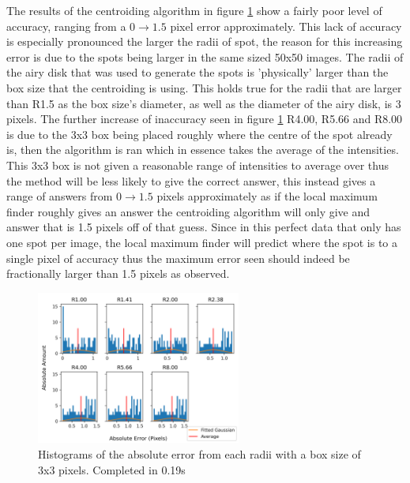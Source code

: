 \documentclass[aps,pra,a4paper,nofootinbib,onecolumn,tightenlines,longbibliography,12pt,amsfonts,amssymb,amsmath,floatfix]{revtex4-2} %
\begin{document}
  The results of the centroiding algorithm in figure \ref{fig:box_3} show a fairly poor 
  level of accuracy, ranging from a $0\rightarrow 1.5$ pixel error approximately. This lack of accuracy 
  is especially pronounced the larger the radii of spot, the reason for this increasing 
  error is due to the spots being larger in the same sized 50x50 images. The radii of the 
  airy disk that was used to generate the spots is 'physically' larger than the box size 
  that the centroiding is using. This holds true for the radii that are larger than R1.5 
  as the box size's diameter, as well as the diameter of the airy disk, is 3 pixels. The further 
  increase of inaccuracy seen in figure \ref{fig:box_3} R4.00, R5.66 and R8.00 is due to the 
  3x3 box being placed roughly where the centre of the spot already is, then the algorithm is 
  ran which in essence takes the average of the intensities. This 3x3 box is not given a reasonable 
  range of intensities to average over thus the method will be less likely to give the correct answer,
  this instead gives a range of answers from $0\rightarrow 1.5$ pixels approximately as if the 
  local maximum finder roughly gives an answer the centroiding algorithm will only give and answer 
  that is 1.5 pixels off of that guess. Since in this perfect data that only has one spot per image, the 
  local maximum finder will predict where the spot is to a single pixel of accuracy thus the maximum 
  error seen should indeed be fractionally larger than 1.5 pixels as observed.

  \begin{figure}[H]
    \begin{center}
      \includegraphics[width=0.6\textwidth]{project_pics/distro_centriod_3.png}
    \end{center}
    \caption{Histograms of the absolute error from each radii with a box size of 3x3 pixels. Completed in 0.19s}
    \label{fig:box_3}
  \end{figure}
\end{document}
